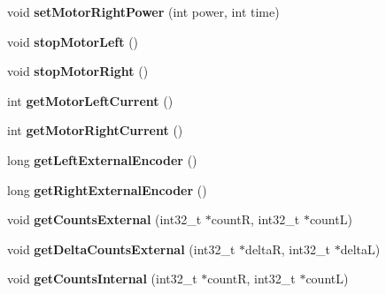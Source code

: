 \begin{DoxyCompactItemize}
\item 
\mbox{\label{classAsservDriver_a54e742670bae9a19dc70b982cad4c3ba}} 
void {\bfseries set\+Motor\+Right\+Power} (int power, int time)
\item 
\mbox{\label{classAsservDriver_a69fb8c78d0ced7bd7f330c18952c84f4}} 
void {\bfseries stop\+Motor\+Left} ()
\item 
\mbox{\label{classAsservDriver_ab24bc1636143db604ecbad3b18a17c8c}} 
void {\bfseries stop\+Motor\+Right} ()
\item 
\mbox{\label{classAsservDriver_ab93d873dc060cff42befa9e50a4a0b32}} 
int {\bfseries get\+Motor\+Left\+Current} ()
\item 
\mbox{\label{classAsservDriver_ace1b02fcab067c77ee71a134614ace50}} 
int {\bfseries get\+Motor\+Right\+Current} ()
\item 
\mbox{\label{classAsservDriver_aa6924c9da7428d59fa712c15221dfbac}} 
long {\bfseries get\+Left\+External\+Encoder} ()
\item 
\mbox{\label{classAsservDriver_afda042c513d96188f8572899679cc616}} 
long {\bfseries get\+Right\+External\+Encoder} ()
\item 
\mbox{\label{classAsservDriver_a40d638a52c2ef3c2e98fe4ffa9a7bfe9}} 
void {\bfseries get\+Counts\+External} (int32\+\_\+t $\ast$countR, int32\+\_\+t $\ast$countL)
\item 
\mbox{\label{classAsservDriver_a588e61ea789b256d73fd04b1f7a840b5}} 
void {\bfseries get\+Delta\+Counts\+External} (int32\+\_\+t $\ast$deltaR, int32\+\_\+t $\ast$deltaL)
\item 
\mbox{\label{classAsservDriver_a643c154d40a2842293fcbf433dc73ee1}} 
void {\bfseries get\+Counts\+Internal} (int32\+\_\+t $\ast$countR, int32\+\_\+t $\ast$countL)
\item 
\mbox{\label{classAsservDriver_a01959c5fd48ed61fedfb22a6c3605ea2}} 

\end{DoxyCompactItemize}
